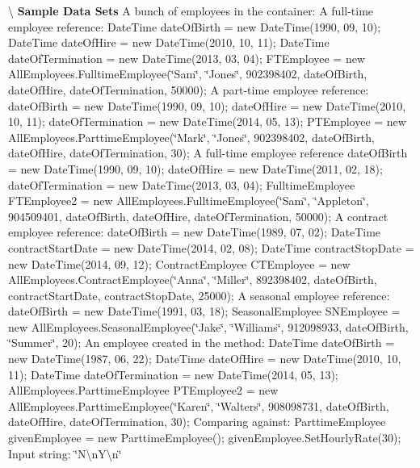 \textbackslash{} {\bfseries  Sample Data Sets} A bunch of employees in the container\+: A full-\/time employee reference\+: Date\+Time date\+Of\+Birth = new Date\+Time(1990, 09, 10); Date\+Time date\+Of\+Hire = new Date\+Time(2010, 10, 11); Date\+Time date\+Of\+Termination = new Date\+Time(2013, 03, 04); F\+T\+Employee = new All\+Employees.\+Fulltime\+Employee(\char`\"{}\+Sam\char`\"{}, \char`\"{}\+Jones\char`\"{}, 902398402, date\+Of\+Birth, date\+Of\+Hire, date\+Of\+Termination, 50000); A part-\/time employee reference\+: date\+Of\+Birth = new Date\+Time(1990, 09, 10); date\+Of\+Hire = new Date\+Time(2010, 10, 11); date\+Of\+Termination = new Date\+Time(2014, 05, 13); P\+T\+Employee = new All\+Employees.\+Parttime\+Employee(\char`\"{}\+Mark\char`\"{}, \char`\"{}\+Jones\char`\"{}, 902398402, date\+Of\+Birth, date\+Of\+Hire, date\+Of\+Termination, 30); A full-\/time employee reference date\+Of\+Birth = new Date\+Time(1990, 09, 10); date\+Of\+Hire = new Date\+Time(2011, 02, 18); date\+Of\+Termination = new Date\+Time(2013, 03, 04); Fulltime\+Employee F\+T\+Employee2 = new All\+Employees.\+Fulltime\+Employee(\char`\"{}\+Sam\char`\"{}, \char`\"{}\+Appleton\char`\"{}, 904509401, date\+Of\+Birth, date\+Of\+Hire, date\+Of\+Termination, 50000); A contract employee reference\+: date\+Of\+Birth = new Date\+Time(1989, 07, 02); Date\+Time contract\+Start\+Date = new Date\+Time(2014, 02, 08); Date\+Time contract\+Stop\+Date = new Date\+Time(2014, 09, 12); Contract\+Employee C\+T\+Employee = new All\+Employees.\+Contract\+Employee(\char`\"{}\+Anna\char`\"{}, \char`\"{}\+Miller\char`\"{}, 892398402, date\+Of\+Birth, contract\+Start\+Date, contract\+Stop\+Date, 25000); A seasonal employee reference\+: date\+Of\+Birth = new Date\+Time(1991, 03, 18); Seasonal\+Employee S\+N\+Employee = new All\+Employees.\+Seasonal\+Employee(\char`\"{}\+Jake\char`\"{}, \char`\"{}\+Williams\char`\"{}, 912098933, date\+Of\+Birth, \char`\"{}\+Summer\char`\"{}, 20); An employee created in the method\+: Date\+Time date\+Of\+Birth = new Date\+Time(1987, 06, 22); Date\+Time date\+Of\+Hire = new Date\+Time(2010, 10, 11); Date\+Time date\+Of\+Termination = new Date\+Time(2014, 05, 13); All\+Employees.\+Parttime\+Employee P\+T\+Employee2 = new All\+Employees.\+Parttime\+Employee(\char`\"{}\+Karen\char`\"{}, \char`\"{}\+Walters\char`\"{}, 908098731, date\+Of\+Birth, date\+Of\+Hire, date\+Of\+Termination, 30); Comparing against\+: Parttime\+Employee given\+Employee = new Parttime\+Employee(); given\+Employee.\+Set\+Hourly\+Rate(30); Input string\+: \char`\"{}\+N\textbackslash{}n\+Y\textbackslash{}n\char`\"{}


